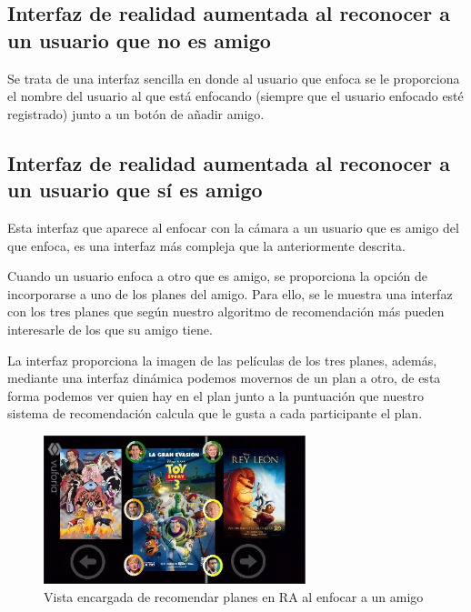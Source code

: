 \subsection{Interfaz de realidad aumentada al reconocer a un usuario que no es amigo}
\label{makereference3.4.5.1}
\begin{flushleft}
Se trata de una interfaz sencilla en donde al usuario que enfoca se le proporciona el nombre del usuario al
 que está enfocando (siempre que el usuario enfocado esté registrado) junto a un botón de añadir amigo.
\end{flushleft}
\subsection{Interfaz de realidad aumentada al reconocer a un usuario que sí es amigo}
\label{makereference3.4.5.2}
\begin{flushleft}
Esta interfaz que aparece al enfocar con la cámara a un usuario que es amigo del que enfoca, es una interfaz
 más compleja que la anteriormente descrita.
\end{flushleft}
\begin{flushleft}
Cuando un usuario enfoca a otro que es amigo, se proporciona la opción de incorporarse a uno de los planes del
 amigo. Para ello, se le muestra una interfaz con los tres planes que según nuestro algoritmo de recomendación
  más pueden interesarle de los que su amigo tiene.
\end{flushleft}
\begin{flushleft}
La interfaz proporciona la imagen de las películas de los tres planes, además, mediante una interfaz dinámica 
podemos movernos de un plan a otro, de esta forma podemos ver quien hay en el plan junto a la puntuación que 
nuestro sistema de recomendación calcula que le gusta a cada participante el plan.
\end{flushleft}
\begin{figure}[H]
        \centering
        \includegraphics[width=3in, angle=270]{figures/chapter-2/recomendadorAR.JPG}
        \caption{Vista encargada de recomendar planes en RA al enfocar a un amigo}
\end{figure}
